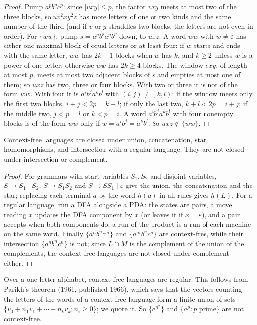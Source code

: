 \begin{proof}
Pump $a^pb^pc^p$: since $|vxy|\le p$, the factor $vxy$ meets at most two of the three blocks, so $uv^2xy^2z$ has more letters of one or two kinds and the same number of the third (and if $v$ or $y$ straddles two blocks, the letters are not even in order). For $\{ww\}$, pump $s=a^pb^pa^pb^p$ down, to $uxz$. A word $ww$ with $w\ne\varepsilon$ has either one maximal block of equal letters or at least four: if $w$ starts and ends with the same letter, $ww$ has $2k-1$ blocks when $w$ has $k$, and $k\ge2$ unless $w$ is a power of one letter; otherwise $ww$ has $2k\ge4$ blocks. The window $vxy$, of length at most $p$, meets at most two adjacent blocks of $s$ and empties at most one of them; so $uxz$ has two, three or four blocks. With two or three it is not of the form $ww$. With four it is $a^ib^ja^kb^l$ with $(i,j)\ne(k,l)$: if the window meets only the first two blocks, $i+j<2p=k+l$; if only the last two, $k+l<2p=i+j$; if the middle two, $j<p=l$ or $k<p=i$. A word $a^ib^ja^kb^l$ with four nonempty blocks is of the form $ww$ only if $w=a^ib^j=a^kb^l$. So $uxz\notin\{ww\}$.
\end{proof}

\begin{proposition}\label{prop:cflclosure}
Context-free languages are closed under union, concatenation, star, homomorphisms, and intersection with a regular language. They are not closed under intersection or complement.
\end{proposition}

\begin{proof}
For grammars with start variables $S_1,S_2$ and disjoint variables, $S\to S_1\mid S_2$, $S\to S_1S_2$ and $S\to SS_1\mid\varepsilon$ give the union, the concatenation and the star; replacing each terminal $a$ by the word $h(a)$ in all rules gives $h(L)$. For a regular language, run a DFA alongside a PDA: the states are pairs, a move reading $x$ updates the DFA component by $x$ (or leaves it if $x=\varepsilon$), and a pair accepts when both components do; a run of the product is a run of each machine on the same word. Finally $\{a^nb^nc^m\}$ and $\{a^mb^nc^n\}$ are context-free, while their intersection $\{a^nb^nc^n\}$ is not; since $L\cap M$ is the complement of the union of the complements, the context-free languages are not closed under complement either.
\end{proof}

\begin{remark}
Over a one-letter alphabet, context-free languages are regular. This follows from Parikh's theorem (1961, published 1966), which says that the vectors counting the letters of the words of a context-free language form a finite union of sets $\{v_0+n_1v_1+\cdots+n_kv_k:n_i\ge0\}$; we quote it. So $\{a^{n^2}\}$ and $\{a^p:p\text{ prime}\}$ are not context-free.
\end{remark}

